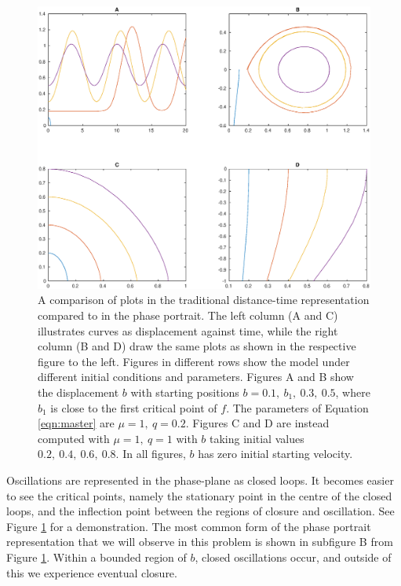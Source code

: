\documentclass{report}
\begin{document}
\begin{figure}
    \centering
    \includegraphics[width=\linewidth]{quadplot_phaseplane_versus_time_2}
    \caption{
        A comparison of plots in the traditional distance-time representation compared to in the phase portrait.
        The left column (A and C) illustrates curves as displacement against time, while the right column (B and D) draw the same plots as shown in the respective figure to the left.
        Figures in different rows show the model under different initial conditions and parameters.
        Figures A and B show the displacement $b$ with starting positions $b=0.1,~b_1,~0.3,~0.5$,
        where $b_1$ is close to the first critical point of $f$. The parameters of Equation \ref{eqn:master} are $\mu=1,~q=0.2$.
        Figures C and D are instead computed with $\mu=1,~q=1$ with $b$ taking initial values $0.2,~0.4,~0.6,~0.8$.
        In all figures, $b$ has zero initial starting velocity.
    }
    \label{fig:phaseportrait_compare}
\end{figure}
Oscillations are represented in the phase-plane as closed loops.
It becomes easier to see the critical points,
namely the stationary point in the centre of the closed loops,
and the inflection point between the regions of closure and oscillation.
See Figure \ref{fig:phaseportrait_compare} for a demonstration.
The most common form of the phase portrait representation that we will observe in this problem is shown in subfigure B from Figure \ref{fig:phaseportrait_compare}.
Within a bounded region of $b$, closed oscillations occur,
and outside of this we experience eventual closure.
\end{document}
